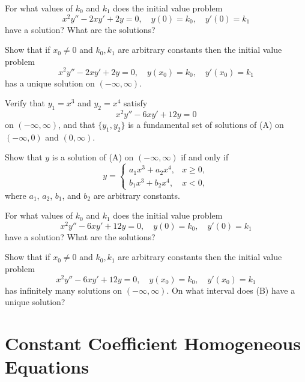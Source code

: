\begin{exerciselist}
\begin{alist}
\item %
 For what values of $k_0$ and  $k_1$
does the initial value problem
\[
x^2y''-2xy'+2y=0,\quad  y(0)=k_0,\quad y'(0)=k_1
\]
have a solution? What are the solutions?

\item %
 Show that if $x_0\ne0$ and $k_0,k_1$  are
arbitrary constants then the initial value problem
\[
x^2y''-2xy'+2y=0,\quad  y(x_0)=k_0,\quad y'(x_0)=k_1
\]
has a unique  solution on $(-\infty,\infty)$.
\end{alist}

\item\label{exer:5.1.44}\begin{alist}
\item %
Verify  that $y_1=x^3$ and $y_2=x^4$ satisfy
\[
x^2y''-6xy'+12y=0
\tag{A}
\]
on $(-\infty,\infty)$, and that $\{y_1,y_2\}$ is a fundamental set of
solutions of (A) on $(-\infty,0)$ and
$(0,\infty)$.
\item %
Show that
$y$ is a solution of  (A) on $(-\infty,\infty)$
if and only if
\[
y=\begin{cases}
a_1x^3+a_2x^4,&x\ge 0,\\
b_1x^3+b_2x^4,&x<0,
\end{cases}
\]
where $a_1$, $a_2$, $b_1$, and $b_2$  are arbitrary constants.

\item %
 For what values of $k_0$ and  $k_1$
does the initial value problem
\[
x^2y''-6xy'+12y=0, \quad  y(0)=k_0,\quad y'(0)=k_1
\]
have a solution? What are the solutions?

\item %
 Show that if $x_0\ne0$ and $k_0,k_1$  are
arbitrary constants then the initial value problem
\[
x^2y''-6xy'+12y=0, \quad  y(x_0)=k_0,\quad y'(x_0)=k_1
\tag{B}
\]
has infinitely many solutions on $(-\infty,\infty)$.  On what interval does
(B) have a unique solution?
\end{alist}

\end{exerciselist}


\section{Constant Coefficient Homogeneous Equations}
\label{sec:const_coeff_homog}

